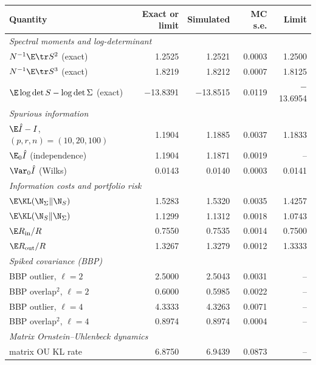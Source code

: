 \begin{tabular}{lrrrr}
\toprule
Quantity & Exact or limit & Simulated & MC s.e. & Limit \\
\midrule
\multicolumn{5}{l}{\emph{Spectral moments and log-determinant}}\\[1pt]
\quad $N^{-1}\E\tr S^2$ (exact) & 1.2525 & 1.2521 & 0.0003 & 1.2500 \\
\quad $N^{-1}\E\tr S^3$ (exact) & 1.8219 & 1.8212 & 0.0007 & 1.8125 \\
\quad $\E\log\det S-\log\det\Sigma$ (exact) & \ensuremath{-}13.8391 & \ensuremath{-}13.8515 & 0.0119 & \ensuremath{-}13.6954 \\
\midrule
\multicolumn{5}{l}{\emph{Spurious information}}\\[1pt]
\quad $\E\hat I-I$, $(p,r,n)=(10,20,100)$ & 1.1904 & 1.1885 & 0.0037 & 1.1833 \\
\quad $\E_0\hat I$ (independence) & 1.1904 & 1.1871 & 0.0019 & -- \\
\quad $\Var_0\hat I$ (Wilks) & 0.0143 & 0.0140 & 0.0003 & 0.0141 \\
\midrule
\multicolumn{5}{l}{\emph{Information costs and portfolio risk}}\\[1pt]
\quad $\E\KL(\N_\Sigma\|\N_S)$ & 1.5283 & 1.5320 & 0.0035 & 1.4257 \\
\quad $\E\KL(\N_S\|\N_\Sigma)$ & 1.1299 & 1.1312 & 0.0018 & 1.0743 \\
\quad $\E R_{\rm in}/R$ & 0.7550 & 0.7535 & 0.0014 & 0.7500 \\
\quad $\E R_{\rm out}/R$ & 1.3267 & 1.3279 & 0.0012 & 1.3333 \\
\midrule
\multicolumn{5}{l}{\emph{Spiked covariance (BBP)}}\\[1pt]
\quad BBP outlier, $\ell=2$ & 2.5000 & 2.5043 & 0.0031 & -- \\
\quad BBP overlap$^2$, $\ell=2$ & 0.6000 & 0.5985 & 0.0022 & -- \\
\quad BBP outlier, $\ell=4$ & 4.3333 & 4.3263 & 0.0071 & -- \\
\quad BBP overlap$^2$, $\ell=4$ & 0.8974 & 0.8974 & 0.0004 & -- \\
\midrule
\multicolumn{5}{l}{\emph{Matrix Ornstein--Uhlenbeck dynamics}}\\[1pt]
\quad matrix OU KL rate & 6.8750 & 6.9439 & 0.0873 & -- \\
\bottomrule
\end{tabular}
